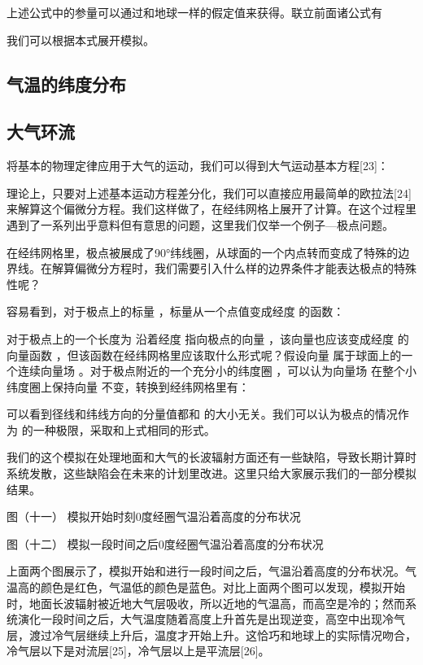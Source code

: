 \documentclass[a4paper,10.5pt]{article}
\begin{document}
上述公式中的参量可以通过和地球一样的假定值来获得。联立前面诸公式有

我们可以根据本式展开模拟。


\subsection{气温的纬度分布}

\subsection{大气环流}

将基本的物理定律应用于大气的运动，我们可以得到大气运动基本方程[23]：



理论上，只要对上述基本运动方程差分化，我们可以直接应用最简单的欧拉法[24]来解算这个偏微分方程。我们这样做了，在经纬网格上展开了计算。在这个过程里遇到了一系列出乎意料但有意思的问题，这里我们仅举一个例子—极点问题。

在经纬网格里，极点被展成了90°纬线圈，从球面的一个内点转而变成了特殊的边界线。在解算偏微分方程时，我们需要引入什么样的边界条件才能表达极点的特殊性呢？

容易看到，对于极点上的标量  ，标量从一个点值变成经度  的函数：



对于极点上的一个长度为  沿着经度  指向极点的向量  ，该向量也应该变成经度  的向量函数  ，但该函数在经纬网格里应该取什么形式呢？假设向量  属于球面上的一个连续向量场  。对于极点附近的一个充分小的纬度圈 ，可以认为向量场  在整个小纬度圈上保持向量  不变，转换到经纬网格里有：



可以看到径线和纬线方向的分量值都和  的大小无关。我们可以认为极点的情况作为  的一种极限，采取和上式相同的形式。

我们的这个模拟在处理地面和大气的长波辐射方面还有一些缺陷，导致长期计算时系统发散，这些缺陷会在未来的计划里改进。这里只给大家展示我们的一部分模拟结果。


图（十一）
模拟开始时刻0度经圈气温沿着高度的分布状况



图（十二）
模拟一段时间之后0度经圈气温沿着高度的分布状况

上面两个图展示了，模拟开始和进行一段时间之后，气温沿着高度的分布状况。气温高的颜色是红色，气温低的颜色是蓝色。对比上面两个图可以发现，模拟开始时，地面长波辐射被近地大气层吸收，所以近地的气温高，而高空是冷的；然而系统演化一段时间之后，大气温度随着高度上升首先是出现逆变，高空中出现冷气层，渡过冷气层继续上升后，温度才开始上升。这恰巧和地球上的实际情况吻合，冷气层以下是对流层[25]，冷气层以上是平流层[26]。
\end{document}
